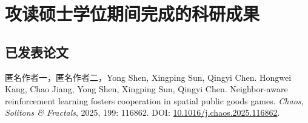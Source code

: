 \chapter{攻读硕士学位期间完成的科研成果}

\section*{已发表论文}
\ifdefined\YNUAnonymous
匿名作者一，匿名作者二，Yong Shen, Xingping Sun, Qingyi Chen.
\else
Hongwei Kang, Chao Jiang, Yong Shen, Xingping Sun, Qingyi Chen.
\fi
Neighbor-aware reinforcement learning fosters cooperation in spatial public goods games.
\textit{Chaos, Solitons \& Fractals}, 2025, 199: 116862.
DOI: \href{https://doi.org/10.1016/j.chaos.2025.116862}{10.1016/j.chaos.2025.116862}.
